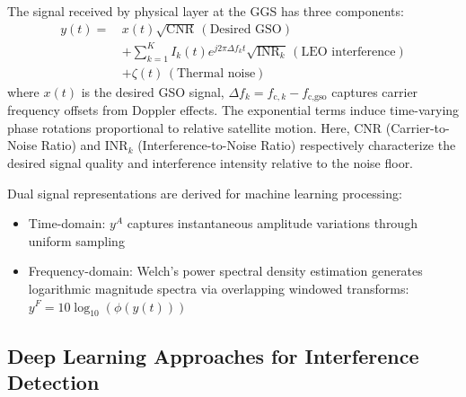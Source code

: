 \documentclass[conference]{IEEEtran}
\begin{document}
The signal received by physical layer at the GGS has three components:
\begin{align}
    y(t) =\, & x(t)\sqrt{\text{CNR}}\, (\text{Desired GSO}) \nonumber                                                 \\[0.5em]
             & + \sum_{k=1}^{K} I_k(t)e^{j2\pi \Delta f_k t}\sqrt{\text{INR}_k}\, (\text{LEO interference}) \nonumber \\[0.5em]
             & + \zeta(t)\, (\text{Thermal noise})
\end{align}
where $x(t)$  is the desired GSO signal, $\Delta f_k = f_{\text{c},k} - f_{\text{c,gso}}$ captures carrier frequency offsets from Doppler effects. The exponential terms induce time-varying phase rotations proportional to relative satellite motion. Here, $\text{CNR}$ (Carrier-to-Noise Ratio) and $\text{INR}_k$ (Interference-to-Noise Ratio) respectively characterize the desired signal quality and interference intensity relative to the noise floor.

Dual signal representations are derived for machine learning processing:
\begin{itemize}
    \item Time-domain: $y^A$ captures instantaneous amplitude variations through uniform sampling
    \item Frequency-domain: Welch's power spectral density estimation generates logarithmic magnitude spectra via overlapping windowed transforms: $y^F = 10\log_{10}(\phi(y(t)))$
\end{itemize}



\subsection{Deep Learning Approaches for Interference Detection}
\label{ssec:related_works}

\end{document}

